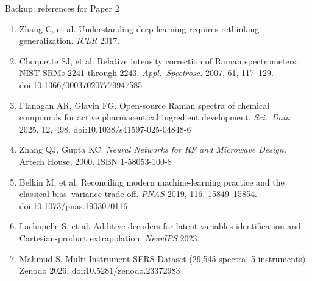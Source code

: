 \documentclass[aspectratio=169,10pt]{beamer}
\begin{document}
\begin{frame}{Backup: references for Paper 2}
\begin{enumerate}
  \item Zhang C, et al. Understanding deep learning requires rethinking generalization. \emph{ICLR} 2017.
  \item Choquette SJ, et al. Relative intensity correction of Raman spectrometers: NIST SRMs 2241 through 2243. \emph{Appl.\ Spectrosc.} 2007, 61, 117--129. doi:10.1366/000370207779947585
  \item Flanagan AR, Glavin FG. Open-source Raman spectra of chemical compounds for active pharmaceutical ingredient development. \emph{Sci.\ Data} 2025, 12, 498. doi:10.1038/s41597-025-04848-6
  \item Zhang QJ, Gupta KC. \emph{Neural Networks for RF and Microwave Design.} Artech House, 2000. ISBN 1-58053-100-8
  \item Belkin M, et al. Reconciling modern machine-learning practice and the classical bias--variance trade-off. \emph{PNAS} 2019, 116, 15849--15854. doi:10.1073/pnas.1903070116
  \item Lachapelle S, et al. Additive decoders for latent variables identification and Cartesian-product extrapolation. \emph{NeurIPS} 2023.
  \item Mahmud S. Multi-Instrument SERS Dataset (29,545 spectra, 5 instruments). Zenodo 2026. doi:10.5281/zenodo.23372983
\end{enumerate}
\end{frame}
\end{document}
